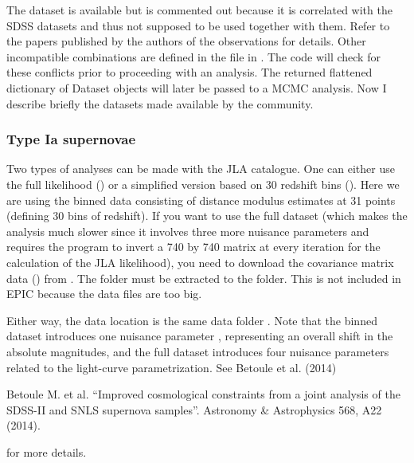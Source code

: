\documentclass[letterpaper,12pt,english]{sphinxhowto}
\begin{document}
The  dataset is available but is commented out because it is
correlated with the SDSS datasets and thus not supposed to be used together
with them.
Refer to the papers published by the authors of the observations for details.
Other incompatible combinations are defined in the
 file in
.
The code will check for these conflicts prior to proceeding with an analysis.
The returned flattened dictionary of Dataset objects will later be passed to a
MCMC analysis.
Now I describe briefly the datasets made available by the community.


\subsubsection{Type Ia supernovae}
\label{\detokenize{thedata:type-ia-supernovae}}
Two types of analyses can be made with the JLA catalogue.
One can either use the full likelihood () or a simplified version
based on 30 redshift bins ().
Here we are using the binned data consisting of distance modulus estimates at
31 points (defining 30 bins of redshift).
If you want to use the full dataset (which makes the analysis much slower since
it involves three more nuisance parameters and requires the program to invert a
740 by 740 matrix at every iteration for the calculation of the JLA
likelihood), you need to download the covariance matrix data
() from
. The 
folder must be extracted to the  folder.
This is not included in EPIC because the data files are too big.

Either way, the data location is the same data folder .
Note that the binned dataset introduces one nuisance parameter ,
representing an overall shift in the absolute magnitudes, and the full dataset
introduces four nuisance parameters related to the light-curve parametrization.
See Betoule et al. (2014) %
\begin{footnote}[1]\sphinxAtStartFootnote
Betoule M. et al. “Improved cosmological constraints from a joint analysis of the SDSS-II and SNLS supernova samples”. Astronomy \& Astrophysics 568, A22 (2014).
%
\end{footnote} for more details.
\end{document}
